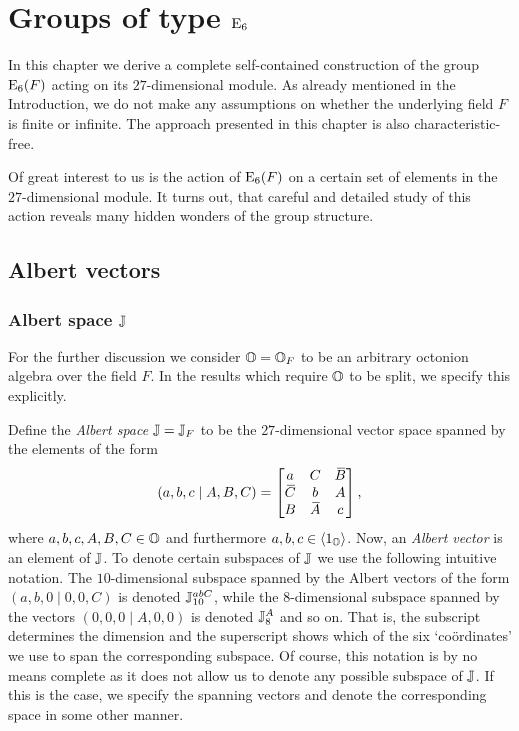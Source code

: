 \chapter{Groups of type $\mathord{\mathrm{E}}_6$}
\ifpdf
    \graphicspath{{Chapter2/Chapter2Figs/PNG/}{Chapter2/Chapter2Figs/PDF/}{Chapter2/Chapter2Figs/}}
\else
    \graphicspath{{Chapter2/Chapter2Figs/EPS/}{Chapter2/Chapter2Figs/}}
\fi

\label{chapter2}

In this chapter we derive a complete self-contained construction
of the group $\mathrm{E}_6(F)$ acting on its $27$-dimensional 
module. As already
mentioned in the Introduction, we do not make any assumptions
on whether the underlying field $F$ is finite or infinite. The 
approach presented in this chapter is also characteristic-free.

Of great interest to us is the action of $\mathrm{E}_6(F)$ on a certain
set of elements in the $27$-dimensional module. It turns out,
that careful and detailed study of this action reveals many
hidden wonders of the group structure.

\section{Albert vectors}

\subsection{Albert space $\mathbb{J}$}

For the further discussion we consider $\mathbb{O} = \mathbb{O}_F$ to be an arbitrary 
octonion algebra over the field $F$. In the results which require $\mathbb{O}$ to be split,
we specify this explicitly. 

Define the \textit{Albert space} $\mathbb{J}=\mathbb{J}_F$ to be 
the $27$-dimensional vector space spanned by the elements of the form
\begin{equation}
	(a,b,c\mid A,B,C) = \begin{bmatrix}
		a & C & \ovB \\
		\ovC & b & A \\
		B & \ovA & c
	\end{bmatrix},
\end{equation}
where $a,b,c,A,B,C \in \mathbb{O}$ and furthermore $a,b,c \in \langle 1_{\mathbb{O}} \rangle$. 
Now, an \textit{Albert vector} is an element of $\mathbb{J}$. To denote
certain subspaces of $\mathbb{J}$ we use the following intuitive notation. The $10$-dimensional
subspace spanned by the Albert vectors of the form \mbox{$(a,b,0\mid 0,0,C)$} is denoted
$\mathbb{J}_{10}^{abC}$, while the $8$-dimensional
subspace spanned by the vectors \mbox{$(0,0,0\mid A,0,0)$} 
is denoted $\mathbb{J}_{8}^{A}$ and so on. That is, the subscript determines the dimension
and the superscript shows which of the six `co{\"o}rdinates' we use to span the
corresponding subspace. Of course, this notation is by no means complete as it does not
allow us to denote any possible subspace of $\mathbb{J}$. If this is the case, we specify 
the spanning vectors and denote the corresponding space in some other manner.

